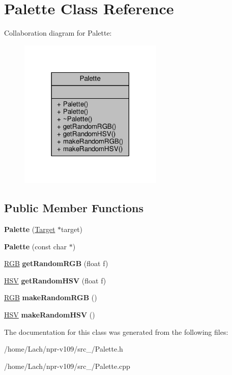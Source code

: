 \hypertarget{classPalette}{}\section{Palette Class Reference}
\label{classPalette}


Collaboration diagram for Palette\+:
\nopagebreak
\begin{figure}[H]
\begin{center}
\leavevmode
\includegraphics[width=194pt]{classPalette__coll__graph}
\end{center}
\end{figure}
\subsection*{Public Member Functions}
\begin{DoxyCompactItemize}
\item 
\hypertarget{classPalette_a9e7d1cfc83132e54f881c95acf0cb0d9}{}\label{classPalette_a9e7d1cfc83132e54f881c95acf0cb0d9} 
{\bfseries Palette} (\hyperlink{classTarget}{Target} $\ast$target)
\item 
\hypertarget{classPalette_ab861218bb6b4b64f24c774deaf26cada}{}\label{classPalette_ab861218bb6b4b64f24c774deaf26cada} 
{\bfseries Palette} (const char $\ast$)
\item 
\hypertarget{classPalette_abec7160109e458ab445ba1eaf752ab85}{}\label{classPalette_abec7160109e458ab445ba1eaf752ab85} 
\hyperlink{structRGB}{R\+GB} {\bfseries get\+Random\+R\+GB} (float f)
\item 
\hypertarget{classPalette_a11248e33e13b761d483f251ec21d9d11}{}\label{classPalette_a11248e33e13b761d483f251ec21d9d11} 
\hyperlink{structHSV}{H\+SV} {\bfseries get\+Random\+H\+SV} (float f)
\item 
\hypertarget{classPalette_a016d36d5c8d07f336291dd06841e7569}{}\label{classPalette_a016d36d5c8d07f336291dd06841e7569} 
\hyperlink{structRGB}{R\+GB} {\bfseries make\+Random\+R\+GB} ()
\item 
\hypertarget{classPalette_a1f6bd00bd930ba9ca75327871adedcb5}{}\label{classPalette_a1f6bd00bd930ba9ca75327871adedcb5} 
\hyperlink{structHSV}{H\+SV} {\bfseries make\+Random\+H\+SV} ()
\end{DoxyCompactItemize}


The documentation for this class was generated from the following files\+:\begin{DoxyCompactItemize}
\item 
/home/\+Lach/npr-\/v109/src\+\_/Palette.\+h\item 
/home/\+Lach/npr-\/v109/src\+\_/Palette.\+cpp\end{DoxyCompactItemize}
